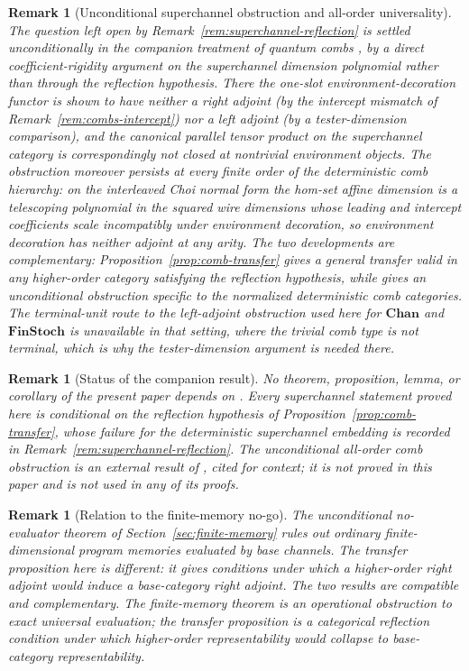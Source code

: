 \documentclass[11pt]{article}
\newtheorem{remark}[theorem]{Remark}
\begin{document}
\begin{remark}[Unconditional superchannel obstruction and all-order universality]
\label{rem:combs-universality}
The question left open by Remark~\ref{rem:superchannel-reflection} is settled
unconditionally in the companion treatment of quantum combs
\cite{Abaee-combs}, by a direct coefficient-rigidity argument on the
superchannel dimension polynomial rather than through the reflection hypothesis.
There the one-slot environment-decoration functor is shown to have neither a
right adjoint (by the intercept mismatch of Remark~\ref{rem:combs-intercept})
nor a left adjoint (by a tester-dimension comparison), and the canonical
parallel tensor product on the superchannel category is correspondingly not
closed at nontrivial environment objects. The obstruction moreover persists at
every finite order of the deterministic comb hierarchy: on the interleaved Choi
normal form the hom-set affine dimension is a telescoping polynomial in the
squared wire dimensions whose leading and intercept coefficients scale
incompatibly under environment decoration, so environment decoration has neither
adjoint at any arity. The two developments are complementary:
Proposition~\ref{prop:comb-transfer} gives a general transfer valid in any
higher-order category satisfying the reflection hypothesis, while
\cite{Abaee-combs} gives an unconditional obstruction specific to the normalized
deterministic comb categories. The terminal-unit route to the left-adjoint
obstruction used here for $\mathbf{Chan}$ and $\mathbf{FinStoch}$ is unavailable
 in that setting, where the trivial comb type is not terminal, which is why the
tester-dimension argument is needed there.
\end{remark}

\begin{remark}[Status of the companion result]
\label{rem:companion-status}
No theorem, proposition, lemma, or corollary of the present paper depends on
\cite{Abaee-combs}. Every superchannel statement proved here is conditional on
the reflection hypothesis of Proposition~\ref{prop:comb-transfer}, whose failure
for the deterministic superchannel embedding is recorded in
Remark~\ref{rem:superchannel-reflection}. The unconditional all-order comb
obstruction is an external result of \cite{Abaee-combs}, cited for context; it is
not proved in this paper and is not used in any of its proofs.
\end{remark}

\begin{remark}[Relation to the finite-memory no-go]
\label{rem:higher-finite-memory}
The unconditional no-evaluator theorem of
Section~\ref{sec:finite-memory} rules out ordinary finite-dimensional
program memories evaluated by base channels. The transfer proposition here
is different: it gives conditions under which a higher-order right adjoint
would induce a base-category right adjoint. The two results are compatible
and complementary. The finite-memory theorem is an operational obstruction
to exact universal evaluation; the transfer proposition is a categorical
reflection condition under which higher-order representability would collapse
to base-category representability.
\end{remark}
\end{document}

